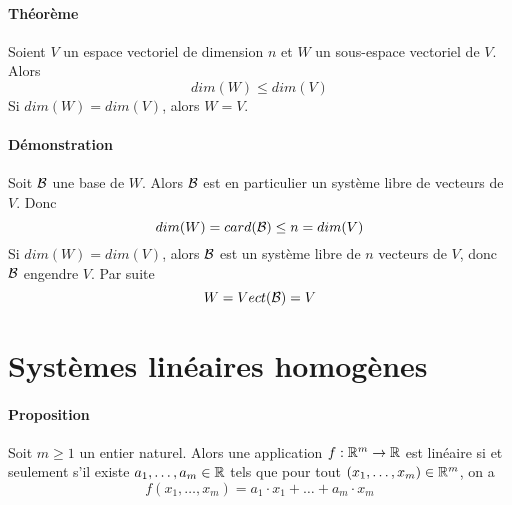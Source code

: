 \paragraph{Théorème} Soient $V$ un espace vectoriel de dimension $n$ et $W$ un sous-espace vectoriel de $V$. Alors 
$$dim(W) \leq dim(V)$$
  Si $dim(W) = dim(V)$, alors $W = V$.
  
\paragraph{Démonstration} Soit $\mathcal{B}$ une base de $W$. Alors $\mathcal{B}$ est en particulier un système libre de vecteurs de $V$. Donc 
$$dim(W) = card(\mathcal{B}) \leq n = dim(V)$$
Si $dim(W) = dim(V)$, alors $\mathcal{B}$ est un système libre de $n$ vecteurs de $V$, donc  $\mathcal{B}$ engendre $V$. Par suite 
$$W = Vect(\mathcal{B}) = V$$

%
%
\section{Systèmes linéaires homogènes}
%
%
\paragraph{Proposition} Soit $m \geq 1$ un entier naturel. Alors une application $f: \mathbb{R}^m \rightarrow \mathbb{R}$ est linéaire si et seulement s'il existe $a_1, \ldots, a_m \in \mathbb{R}$ tels que pour tout $(x_1, \ldots, x_m) \in \mathbb{R}^m$, on a
$$f(x_1, \ldots, x_m) = a_1 \cdot x_1 + \ldots + a_m \cdot x_m$$

